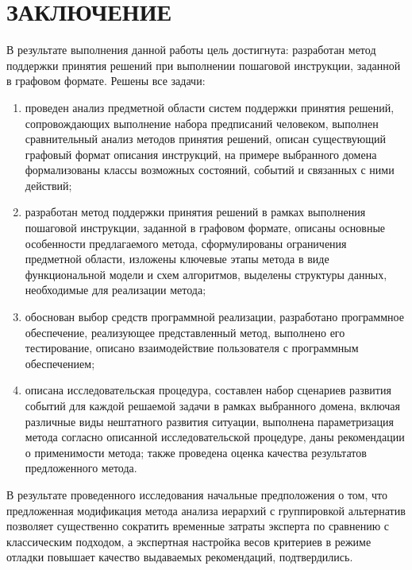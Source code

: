 \chapter*{ЗАКЛЮЧЕНИЕ}

В результате выполнения данной работы цель достигнута: разработан метод поддержки принятия решений при выполнении пошаговой инструкции, заданной в графовом формате. Решены все задачи:

\begin{enumerate}
    \item проведен анализ предметной области систем поддержки принятия решений, сопровождающих выполнение набора предписаний человеком, выполнен сравнительный анализ методов принятия решений, описан существующий графовый формат описания инструкций, на примере выбранного домена формализованы классы возможных состояний, событий и связанных с ними действий;
    \item разработан метод поддержки принятия решений в рамках выполнения пошаговой инструкции, заданной в графовом формате, описаны основные особенности предлагаемого метода, сформулированы ограничения предметной области, изложены ключевые этапы метода в виде функциональной модели и схем алгоритмов, выделены структуры данных, необходимые для реализации метода;
    \item обоснован выбор средств программной реализации, разработано программное обеспечение, реализующее представленный метод, выполнено его тестирование, описано взаимодействие пользователя с программным обеспечением;
    \item описана исследовательская процедура, составлен набор сценариев развития событий для каждой решаемой задачи в рамках выбранного домена, включая различные виды нештатного развития ситуации, выполнена параметризация метода согласно описанной исследовательской процедуре, даны рекомендации о применимости метода; также проведена оценка качества результатов предложенного метода.
\end{enumerate}

В результате проведенного исследования начальные предположения о том, что предложенная модификация метода анализа иерархий с группировкой альтернатив позволяет существенно сократить временные затраты эксперта по сравнению с классическим подходом, а экспертная настройка весов критериев в режиме отладки повышает качество выдаваемых рекомендаций, подтвердились.



